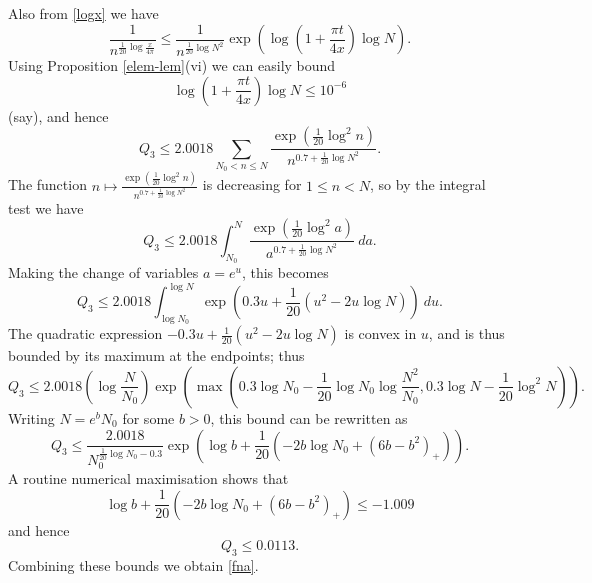 Also from \eqref{logx} we have
$$ \frac{1}{n^{\frac{1}{20} \log \frac{x}{4\pi}}} \leq \frac{1}{n^{\frac{1}{20} \log N^2}} \exp(\log(1 + \frac{\pi t}{4x}) \log N).$$
Using Proposition \ref{elem-lem}(vi) we can easily bound
$$ \log(1 + \frac{\pi t}{4x}) \log N \leq 10^{-6}$$
(say), and hence
$$ Q_3 \leq 2.0018 \sum_{N_0 < n \leq N} \frac{\exp( \frac{1}{20} \log^2 n)}{n^{0.7 + \frac{1}{20} \log N^2}}.$$
The function $n \mapsto \frac{\exp( \frac{1}{20} \log^2 n)}{n^{0.7 + \frac{1}{20} \log N^2}}$ is decreasing for $1 \leq n < N$, so by the integral test we have
$$ Q_3 \leq 2.0018 \int_{N_0}^N \frac{\exp( \frac{1}{20} \log^2 a)}{a^{0.7 + \frac{1}{20} \log N^2}}\ da.$$
Making the change of variables $a = e^u$, this becomes
$$ Q_3 \leq 2.0018 \int_{\log N_0}^{\log N} \exp( 0.3 u + \frac{1}{20} (u^2 - 2u \log N) )\ du.$$
The quadratic expression $- 0.3 u + \frac{1}{20} (u^2 - 2u \log N)$ is convex in $u$, and is thus bounded by its maximum at the endpoints; thus
$$ Q_3 \leq 2.0018 (\log \frac{N}{N_0}) \exp( \max( 0.3 \log N_0 -\frac{1}{20} \log N_0 \log \frac{N^2}{N_0}, 0.3 \log N - \frac{1}{20} \log^2 N ) ).$$
Writing $N = e^b N_0$ for some $b>0$, this bound can be rewritten as 
$$ Q_3 \leq \frac{2.0018}{N_0^{\frac{1}{20} \log N_0 - 0.3}} \exp( \log b + \frac{1}{20} ( -2b \log N_0 + (6b-b^2)_+ ) ).$$
A routine numerical maximisation shows that
$$ \log b + \frac{1}{20} ( -2b \log N_0 + (6b-b^2)_+ ) \leq -1.009$$
and hence
$$ Q_3 \leq 0.0113.$$
Combining these bounds we obtain \eqref{fna}.


